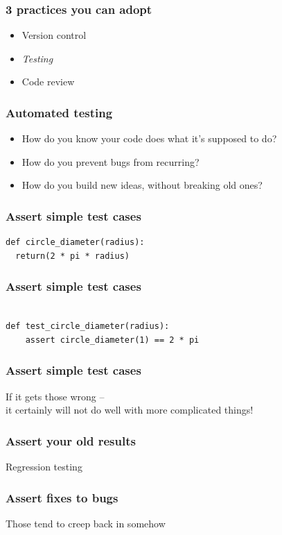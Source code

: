 \documentclass{beamer}
\begin{document}
\begin{frame}
\frametitle{3 practices you can adopt}
\begin{itemize}
\item
Version control
\item
\emph{Testing}
\item
Code review 
\end{itemize}
\end{frame}


\begin{frame}
\frametitle{Automated testing}
\begin{itemize}
\pause
\item
How do you know your code does what it's supposed to do?
\pause
\item
How do you prevent bugs from recurring?
\item
\pause 
How do you build new ideas, without breaking old ones?
\end{itemize}
\end{frame}

\begin{frame}[fragile]
\frametitle{Assert simple test cases}
\begin{lstlisting}
def circle_diameter(radius):
  return(2 * pi * radius)
\end{lstlisting}
\end{frame}

\begin{frame}[fragile]
\frametitle{Assert simple test cases}
\begin{lstlisting}

def test_circle_diameter(radius):
    assert circle_diameter(1) == 2 * pi

\end{lstlisting}
\end{frame}

\begin{frame}[fragile]
\frametitle{Assert simple test cases}
If it gets those wrong -- 
\\ 
it certainly will not do well with more complicated things!
\end{frame}


\begin{frame}[fragile]
\frametitle{Assert your old results}

Regression testing

\end{frame}


\begin{frame}[fragile]
\frametitle{Assert fixes to bugs}

Those tend to creep back in somehow 

\end{frame}
\end{document}

